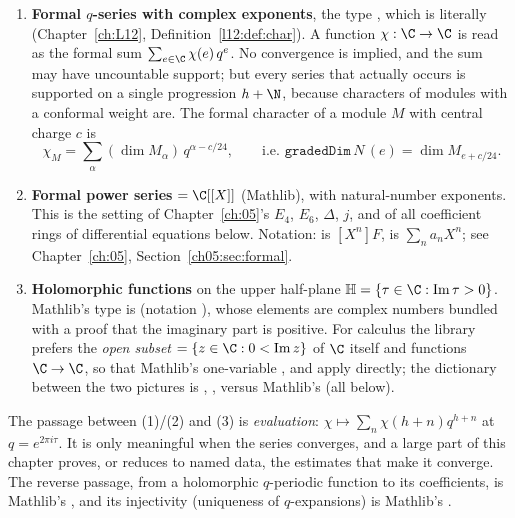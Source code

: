 \begin{enumerate}
\item \textbf{Formal $q$-series with complex exponents}, the type , which is literally 
  (Chapter~\ref{ch:L12}, Definition~\ref{l12:def:char}). A function $\chi:\C\to\C$ is read as the formal sum
  $\sum_{e\in\C}\chi(e)\,q^e$. No convergence is implied, and the sum may have uncountable support; but every series that
  actually occurs is supported on a single progression $h+\N$, because characters of modules with a conformal weight
  are. The formal character of a module $M$ with central charge $c$ is
  \begin{equation*}
    \chi_M = \sum_{\alpha}(\dim M_\alpha)\,q^{\alpha - c/24},\qquad \text{i.e. } \mathtt{gradedDim}\,N\,(e) = \dim M_{e+c/24}.
  \end{equation*}
\item \textbf{Formal power series}  $=\C[[X]]$ (Mathlib), with natural-number exponents. This is the
  setting of Chapter~\ref{ch:05}'s $E_4$, $E_6$, $\Delta$, $j$, and of all coefficient rings of differential equations below.
  Notation:  is $[X^n]F$,  is $\sum_na_nX^n$; see Chapter~\ref{ch:05},
  Section~\ref{ch05:sec:formal}.
\item \textbf{Holomorphic functions} on the upper half-plane $\lfourteenH = \{\tau\in\C:\lfourteenIm\tau>0\}$. Mathlib's type is
   (notation ), whose elements are complex numbers bundled with a proof that the imaginary part
  is positive. For calculus the library prefers the \emph{open subset}  $=\{z\in\C : 0<\lfourteenIm z\}$ of $\C$
  itself and functions $\C\to\C$, so that Mathlib's one-variable ,  and
   apply directly; the dictionary between the two pictures is ,
  ,  versus Mathlib's  (all below).
\end{enumerate}
The passage between (1)/(2) and (3) is \emph{evaluation}: $\chi\mapsto\sum_n\chi(h+n)q^{h+n}$ at $q = e^{2\pi i\tau}$. It is
only meaningful when the series converges, and a large part of this chapter proves, or reduces to named data, the
estimates that make it converge. The reverse passage, from a holomorphic $q$-periodic function to its coefficients, is
Mathlib's , and its injectivity (uniqueness of $q$-expansions) is Mathlib's
.

